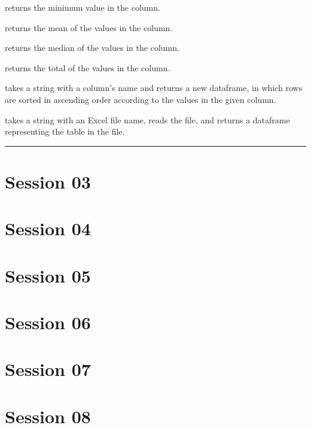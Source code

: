 \documentclass[letterpaper,10pt,english]{sphinxmanual}
\begin{document}
 returns the minimum value in the column.

 returns the mean of the values in the column.

 returns the median of the values in the column.

 returns the total of the values in the column.

 takes a string with a column’s name and returns a new dataframe, in which rows are sorted in ascending order according to the values in the given column.

 takes a string with an Excel file name, reads the file, and returns a dataframe representing the table in the file.


\bigskip\hrule\bigskip



\section{Session 03}
\label{\detokenize{index:session-03}}

\section{Session 04}
\label{\detokenize{index:session-04}}

\section{Session 05}
\label{\detokenize{index:session-05}}

\section{Session 06}
\label{\detokenize{index:session-06}}

\section{Session 07}
\label{\detokenize{index:session-07}}

\section{Session 08}
\label{\detokenize{index:session-08}}


\renewcommand{\indexname}{Index}
\printindex
\end{document}
